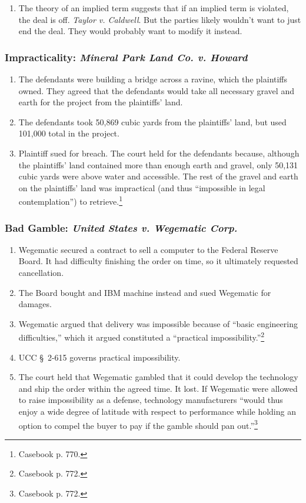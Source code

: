\begin{enumerate}
    \item The theory of an implied term suggests that if an implied term is 
    violated, the deal is off. \emph{Taylor v. Caldwell}. But the parties 
    likely wouldn't want to just end the deal. They would probably want to 
    modify it instead.
\end{enumerate}

\subsubsection{Impracticality: \emph{Mineral Park Land Co. v. Howard}}

\begin{enumerate}
    \item The defendants were building a bridge across a ravine, which the 
    plaintiffs owned. They agreed that the defendants would take all necessary 
    gravel and earth for the project from the plaintiffs' land.
    \item The defendants took 50,869 cubic yards from the plaintiffs' land, 
    but used 101,000 total in the project.
    \item Plaintiff sued for breach. The court held for the defendants 
    because, although the plaintiffs' land contained more than enough earth 
    and gravel, only 50,131 cubic yards were above water and accessible. The 
    rest of the gravel and earth on the plaintiffs' land was impractical (and 
    thus ``impossible in legal contemplation'') to retrieve.\footnote{Casebook 
    p. 770.}
\end{enumerate}

\subsubsection{Bad Gamble: \emph{United States v. Wegematic Corp.}}

\begin{enumerate}
    \item Wegematic secured a contract to sell a computer to the Federal 
    Reserve Board. It had difficulty finishing the order on time, so it 
    ultimately requested cancellation.
    \item The Board bought and IBM machine instead and sued Wegematic for 
    damages.
    \item Wegematic argued that delivery was impossible because of ``basic 
    engineering difficulties,'' which it argued constituted a ``practical 
    impossibility.''\footnote{Casebook p. 772.}
    \item UCC \S\ 2-615 governs practical impossibility.
    \item The court held that Wegematic gambled that it could develop the 
    technology and ship the order within the agreed time. It lost. If 
    Wegematic were allowed to raise impossibility as a defense, technology 
    manufacturers ``would thus enjoy a wide degree of latitude with respect to 
    performance while holding an option to compel the buyer to pay if the 
    gamble should pan out.''\footnote{Casebook p. 772.}
\end{enumerate}

